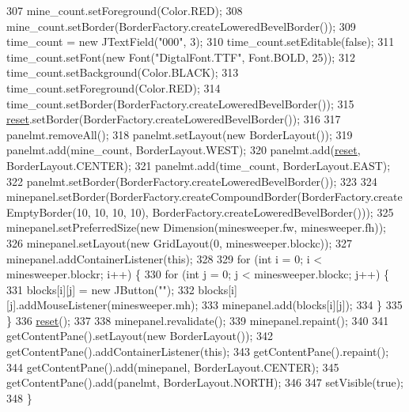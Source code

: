 \begin{DoxyCode}
307         mine\_count.setForeground(Color.RED);
308         mine\_count.setBorder(BorderFactory.createLoweredBevelBorder());
309         time\_count = \textcolor{keyword}{new} JTextField(\textcolor{stringliteral}{"000"}, 3);
310         time\_count.setEditable(\textcolor{keyword}{false});
311         time\_count.setFont(\textcolor{keyword}{new} Font(\textcolor{stringliteral}{"DigtalFont.TTF"}, Font.BOLD, 25));
312         time\_count.setBackground(Color.BLACK);
313         time\_count.setForeground(Color.RED);
314         time\_count.setBorder(BorderFactory.createLoweredBevelBorder());
315         \hyperlink{classhufs_1_1cse_1_1khk_1_1_minesweeper_u_i_a137388c25def2c90fe13e34d6234207d}{reset}.setBorder(BorderFactory.createLoweredBevelBorder());
316  
317         panelmt.removeAll();
318         panelmt.setLayout(\textcolor{keyword}{new} BorderLayout());
319         panelmt.add(mine\_count, BorderLayout.WEST);
320         panelmt.add(\hyperlink{classhufs_1_1cse_1_1khk_1_1_minesweeper_u_i_a137388c25def2c90fe13e34d6234207d}{reset}, BorderLayout.CENTER);
321         panelmt.add(time\_count, BorderLayout.EAST);
322         panelmt.setBorder(BorderFactory.createLoweredBevelBorder());
323  
324         minepanel.setBorder(BorderFactory.createCompoundBorder(BorderFactory.createEmptyBorder(10, 10, 10, 
      10), BorderFactory.createLoweredBevelBorder()));
325         minepanel.setPreferredSize(\textcolor{keyword}{new} Dimension(minesweeper.fw, minesweeper.fh));
326         minepanel.setLayout(\textcolor{keyword}{new} GridLayout(0, minesweeper.blockc));
327         minepanel.addContainerListener(\textcolor{keyword}{this});
328  
329         \textcolor{keywordflow}{for} (\textcolor{keywordtype}{int} i = 0; i < minesweeper.blockr; i++) \{
330             \textcolor{keywordflow}{for} (\textcolor{keywordtype}{int} j = 0; j < minesweeper.blockc; j++) \{
331                 blocks[i][j] = \textcolor{keyword}{new} JButton(\textcolor{stringliteral}{""});
332                 blocks[i][j].addMouseListener(minesweeper.mh);
333                 minepanel.add(blocks[i][j]);
334             \}
335         \}
336         \hyperlink{classhufs_1_1cse_1_1khk_1_1_minesweeper_u_i_a137388c25def2c90fe13e34d6234207d}{reset}();
337  
338         minepanel.revalidate();
339         minepanel.repaint();
340  
341         getContentPane().setLayout(\textcolor{keyword}{new} BorderLayout());
342         getContentPane().addContainerListener(\textcolor{keyword}{this});
343         getContentPane().repaint();
344         getContentPane().add(minepanel, BorderLayout.CENTER);
345         getContentPane().add(panelmt, BorderLayout.NORTH);
346         
347         setVisible(\textcolor{keyword}{true});
348     \}
\end{DoxyCode}
